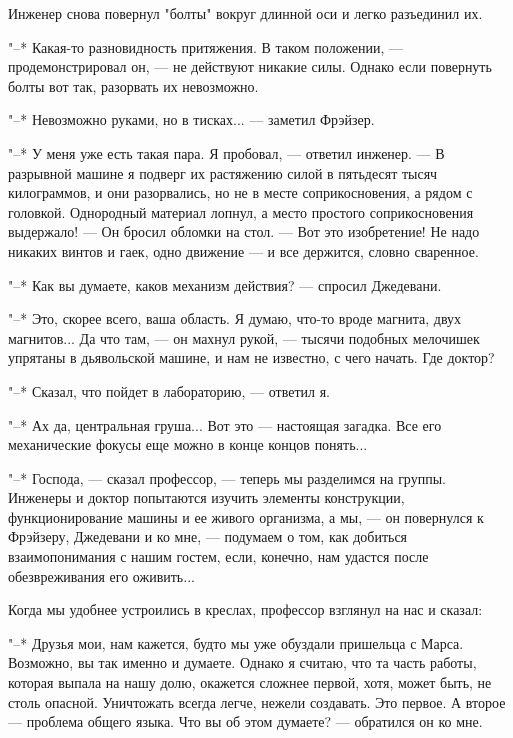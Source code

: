 Инженер снова повернул "болты" вокруг длинной оси  и  легко  разъединил
их.

"--*   Какая-то   разновидность   притяжения.   В   таком   положении,   ---
продемонстрировал он, --- не действуют никакие силы. Однако  если  повернуть
болты вот так, разорвать их невозможно.

"--* Невозможно руками, но в тисках... --- заметил Фрэйзер.

"--* У меня уже есть такая пара.  Я  пробовал,  ---  ответил  инженер.  ---  В
разрывной  машине  я  подверг  их  растяжению  силой  в  пятьдесят   тысяч
килограммов, и они разорвались, но не в месте соприкосновения, а  рядом  с
головкой. Однородный материал лопнул,  а  место  простого  соприкосновения
выдержало! --- Он бросил обломки на стол. --- Вот  это  изобретение!  Не  надо
никаких винтов и гаек, одно движение --- и все держится, словно сваренное.

"--* Как вы думаете, каков механизм действия? --- спросил Джедевани.

"--* Это, скорее всего, ваша область. Я думаю, что-то вроде магнита,  двух
магнитов... Да что там, --- он махнул рукой,  ---  тысячи  подобных  мелочишек
упрятаны в дьявольской машине, и нам  не  известно,  с  чего  начать.  Где
доктор?

"--* Сказал, что пойдет в лабораторию, --- ответил я.

"--* Ах да, центральная груша... Вот это  ---  настоящая  загадка.  Все  его
механические фокусы еще можно в конце концов понять...

"--* Господа, --- сказал  профессор,  ---  теперь  мы  разделимся  на  группы.
Инженеры   и   доктор    попытаются    изучить    элементы    конструкции,
функционирование машины и ее живого организма, а мы,  ---  он  повернулся  к
Фрэйзеру,  Джедевани  и  ко  мне,  ---  подумаем   о   том,   как   добиться
взаимопонимания  с  нашим  гостем,  если,  конечно,  нам   удастся   после
обезвреживания его оживить...

Когда мы удобнее устроились в креслах,  профессор  взглянул  на  нас  и
сказал:

"--* Друзья мои, нам кажется, будто мы уже  обуздали  пришельца  с  Марса.
Возможно, вы так именно и думаете. Однако я считаю, что та  часть  работы,
которая выпала на нашу долю, окажется сложнее первой, хотя, может быть, не
столь опасной. Уничтожать всегда легче, нежели создавать.  Это  первое.  А
второе --- проблема общего языка. Что вы об этом думаете? --- обратился он  ко
мне.

